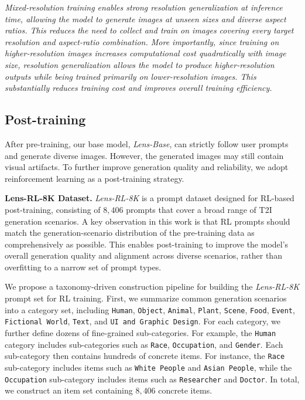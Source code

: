 \documentclass{llmxive}
\begin{document}
\begin{tcolorbox}[colback=gray!5,colframe=black]
\textit{Mixed-resolution training enables strong resolution generalization at inference time, allowing the model to generate images at unseen sizes and diverse aspect ratios. This reduces the need to collect and train on images covering every target resolution and aspect-ratio combination. More importantly, since training on higher-resolution images increases computational cost quadratically with image size, resolution generalization allows the model to produce higher-resolution outputs while being trained primarily on lower-resolution images. This substantially reduces training cost and improves overall training efficiency.}
\end{tcolorbox}



\subsection{Post-training}
\label{sec:post-training}

After pre-training, our base model, \textit{Lens-Base}, can strictly follow user prompts and generate diverse images. However, the generated images may still contain visual artifacts. To further improve generation quality and reliability, we adopt reinforcement learning as a post-training strategy. 



\noindent\textbf{Lens-RL-8K Dataset.} \textit{Lens-RL-8K} is a prompt dataset designed for RL-based post-training, consisting of $8{,}406$ prompts that cover a broad range of T2I generation scenarios. A key observation in this work is that RL prompts should match the generation-scenario distribution of the pre-training data as comprehensively as possible. This enables post-training to improve the model’s overall generation quality and alignment across diverse scenarios, rather than overfitting to a narrow set of prompt types. 


We propose a taxonomy-driven construction pipeline for building the \textit{Lens-RL-8K} prompt set for RL training. First, we summarize common generation scenarios into a category set, including \texttt{Human}, \texttt{Object}, \texttt{Animal}, \texttt{Plant}, \texttt{Scene}, \texttt{Food}, \texttt{Event}, \texttt{Fictional World}, \texttt{Text}, and \texttt{UI and Graphic Design}. For each category, we further define dozens of fine-grained sub-categories. For example, the \texttt{Human} category includes sub-categories such as \texttt{Race}, \texttt{Occupation}, and \texttt{Gender}. Each sub-category then contains hundreds of concrete items. For instance, the \texttt{Race} sub-category includes items such as \texttt{White People} and \texttt{Asian People}, while the \texttt{Occupation} sub-category includes items such as \texttt{Researcher} and \texttt{Doctor}. In total, we construct an item set containing $8,406$ concrete items.
\end{document}
